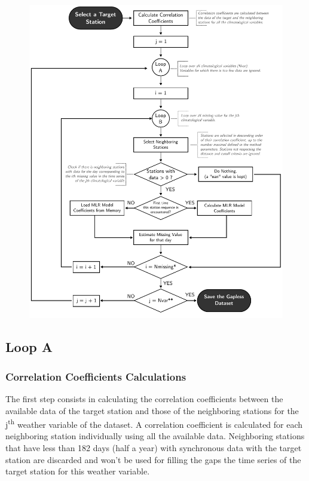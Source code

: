 \documentclass[TechnicalNoteMeteo.tex]{subfiles}
\begin{document}
\begin{figure}[!p]
    \centering
    \includegraphics[width=\textwidth]{img/Flowchart-filling_missing_weather.pdf} 
    \caption{}
    \label{fig:fillworker_flowchart}
\end{figure}

\subsection{Loop A}

\subsubsection{Correlation Coefficients Calculations}

The first step consists in calculating the correlation coefficients between the available data of the target station and those of the neighboring stations for the j\textsuperscript{th} weather variable of the dataset. A correlation coefficient is calculated for each neighboring station individually using all the available data. Neighboring stations that have less than 182 days (half a year) with synchronous data with the target station are discarded and won't be used for filling the gaps the time series of the target station for this weather variable.
\end{document}
